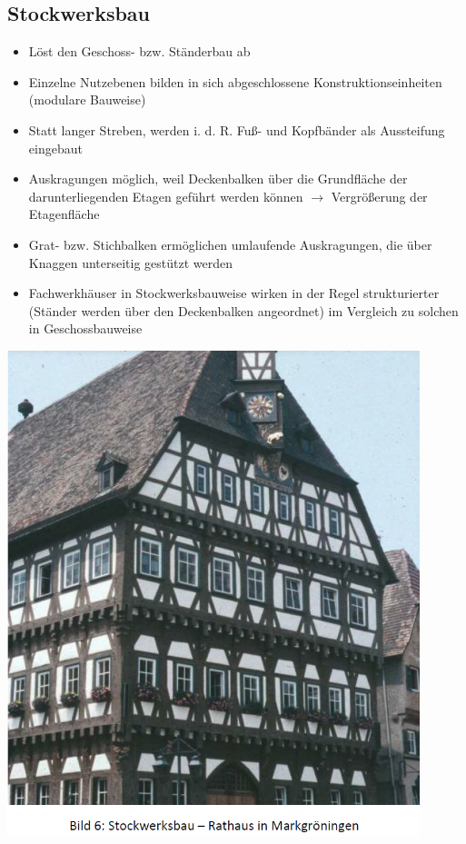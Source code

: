 \documentclass[fleqn,twoside]{article}
\begin{document}
\subsection{Stockwerksbau}
    \begin{minipage}{0.6\textwidth}
    \begin{itemize}
        \item Löst den Geschoss- bzw. Ständerbau ab
        \item Einzelne Nutzebenen bilden in sich abgeschlossene Konstruktionseinheiten (modulare Bauweise)
        \item Statt langer Streben, werden i. d. R. Fuß- und Kopfbänder als Aussteifung eingebaut
        \item Auskragungen möglich, weil Deckenbalken über die Grundfläche der darunterliegenden Etagen geführt werden können $\rightarrow$ Vergrößerung der Etagenfläche
        \item Grat- bzw. Stichbalken ermöglichen umlaufende Auskragungen, die über Knaggen unterseitig gestützt werden
        \item Fachwerkhäuser in Stockwerksbauweise wirken in der Regel strukturierter (Ständer werden über den Deckenbalken angeordnet) im Vergleich zu solchen in Geschossbauweise
    \end{itemize}
    \end{minipage}
    \begin{minipage}{0.4\textwidth}
        \includegraphics[width=0.9\textwidth]{Grafiken/Geschichte des Holzbaus/Stockwerksbau.png}
    \end{minipage}
    
\end{document}
